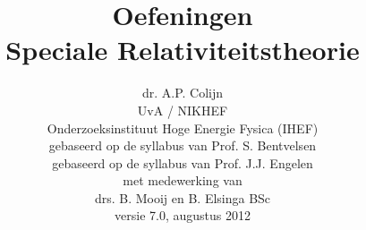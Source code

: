 \documentclass[12pt,twoside,a4paper,dutch]{article}
\begin{document}
\thispagestyle{empty}
\newpage
\thispagestyle{empty}
\newpage
\cleardoublepage

\title{\Huge\bf Oefeningen \\ Speciale Relativiteitstheorie}
\author{\large dr. A.P. Colijn\\[0.1cm]
UvA / NIKHEF\\[0.1cm]  
Onderzoeksinstituut Hoge Energie Fysica (IHEF) \\[0.5cm]
gebaseerd op de syllabus van Prof. S. Bentvelsen\\[0.1cm]
gebaseerd op de syllabus van Prof. J.J. Engelen\\[0.1cm]
met medewerking van \\[0.1cm]
drs. B. Mooij en B. Elsinga BSc\\[1.0cm]
versie 7.0, augustus 2012}


\date{}
\maketitle 
\thispagestyle{empty}
\cleardoublepage


\pagestyle{plain}
\setcounter{page}{1}
\tableofcontents
\cleardoublepage

\pagestyle{headings}
\setcounter{page}{1}

% 
% 
\end{document}
